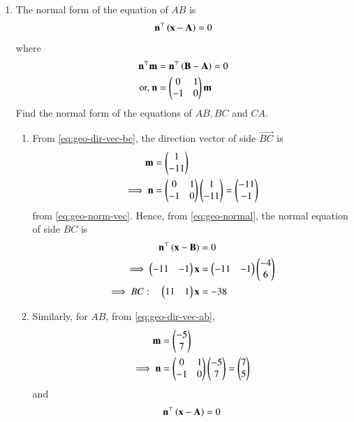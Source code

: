 \begin{enumerate}[label=\thesubsection.\arabic*.,ref=\thesubsection.\theenumi]
%		
\item The normal form of the equation of $AB$  is 
		\begin{align}
			\label{eq:geo-normal}
			\mathbf{n}^{\top}\left(	\mathbf{x}-\mathbf{A}\right) = 0
		\end{align}
		where 
		\begin{align}
			\mathbf{n}^{\top}\mathbf{m}&=\mathbf{n}^{\top}\left(\mathbf{B}-\mathbf{A}\right) = 0
			\\
			\text{or, } \mathbf{n}&=\begin{pmatrix}0 & 1 \\ -1 & 0\end{pmatrix} \mathbf{m}
			\label{eq:geo-norm-vec}
		\end{align}
Find the normal form of the equations of $AB, BC$ and $CA$.
\\
\solution
\begin{enumerate}
	\item
From
		\eqref{eq:geo-dir-vec-bc}, 
the direction vector of side $\vec{BC}$ is
\begin{align}
\mathbf{m}
	&=\begin{pmatrix}1\\-11\end{pmatrix}
	\\
\implies \mathbf{n} &= \begin{pmatrix}0 & 1\\
  -1 & 0\end{pmatrix}\begin{pmatrix}1\\-11\end{pmatrix}
 = \begin{pmatrix}-11\\-1\end{pmatrix}
		\label{eq:geo-norm-vec-bc}
\end{align}
from 
			\eqref{eq:geo-norm-vec}.
Hence, from 
			\eqref{eq:geo-normal},
the normal equation of side $BC$ is 
\begin{align}
	\mathbf{n}^{\top}\left(	\mathbf{x}-\mathbf{B}\right) &= 0
			\\
\implies    \begin{pmatrix}-11 & -1\end{pmatrix}\mathbf{x}&=\begin{pmatrix}-11 & -1\end{pmatrix}\begin{pmatrix}-4\\6\end{pmatrix}\\
    \implies
BC: \quad    \begin{pmatrix}11 & 1\end{pmatrix}\mathbf{x}&=-38
\end{align}
\item Similarly, for $AB$,
from 
		\eqref{eq:geo-dir-vec-ab}, 
\begin{align}
	\mathbf{m} &= \begin{pmatrix}-5\\7\end{pmatrix}
	\\
\implies        \mathbf{n} 
                &= \begin{pmatrix}0&1\\-1&0\end{pmatrix}\begin{pmatrix}-5\\7\end{pmatrix}
                = \begin{pmatrix}7\\5\end{pmatrix}
		\label{eq:geo-norm-vec-ab}
\end{align}
and 
\begin{align}
	\vec{n}^{\top}\brak{	\vec{x}-\vec{A}} &= 0
	\\

\end{align}
\end{enumerate}
\end{enumerate}
